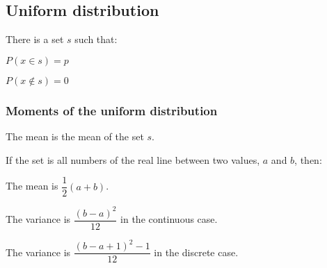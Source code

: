 
\subsection{Uniform distribution}

There is a set \(s\) such that:

\(P(x\in s)=p\)

\(P(x\not\in s)=0\)

\subsubsection{Moments of the uniform distribution}

The mean is the mean of the set \(s\).

If the set is all numbers of the real line between two values, \(a\) and \(b\), then:

The mean is \(\dfrac{1}{2}(a+b)\).

The variance is \(\dfrac{(b-a)^2}{12}\) in the continuous case.

The variance is \(\dfrac{(b-a+1)^2-1}{12}\) in the discrete case.

